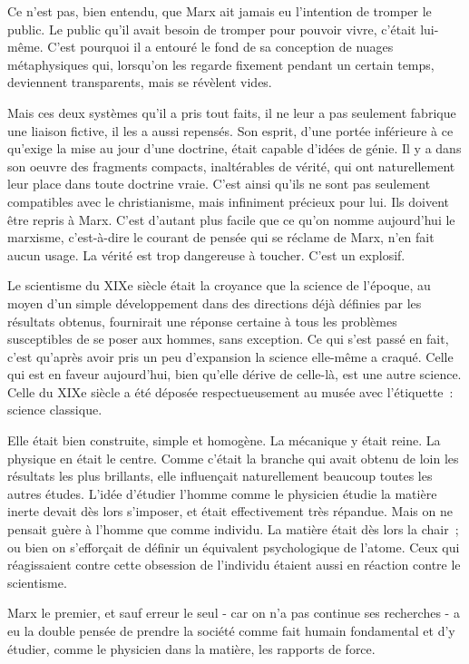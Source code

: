 \documentclass[french,twoside]{book} %
\begin{document}
Ce n'est pas, bien entendu, que Marx ait jamais eu l'intention de tromper le public. Le public qu'il avait besoin de tromper pour pouvoir vivre, c'était lui-même. C'est pourquoi il a entouré le fond de sa conception de nuages métaphysiques qui, lorsqu'on les regarde fixement pendant un certain temps, deviennent transparents, mais se révèlent vides.\par
Mais ces deux systèmes qu'il a pris tout faits, il ne leur a pas seulement fabrique une liaison fictive, il les a aussi repensés. Son esprit, d'une portée inférieure à ce qu'exige la mise au jour d'une doctrine, était capable d'idées de génie. Il y a dans son oeuvre des fragments compacts, inaltérables de vérité, qui ont naturellement leur place dans toute doctrine vraie. C'est ainsi qu'ils ne sont pas seulement compatibles avec le christianisme, mais infiniment précieux pour lui. Ils doivent être repris à Marx. C'est d'autant plus facile que ce qu'on nomme aujourd'hui le marxisme, c'est-à-dire le courant de pensée qui se réclame de Marx, n'en fait aucun usage. La vérité est trop dangereuse à toucher. C'est un explosif.\par
Le scientisme du XIXe siècle était la croyance que la science de l'époque, au moyen d'un simple développement dans des directions déjà définies par les résultats obtenus, fournirait une réponse certaine à tous les problèmes susceptibles de se poser aux hommes, sans exception. Ce qui s'est passé en fait, c'est qu'après avoir pris un peu d'expansion la science elle-même a craqué. Celle qui est en faveur aujourd'hui, bien qu'elle dérive de celle-là, est une autre science. Celle du XIXe siècle a été déposée respectueusement au musée avec l'étiquette : science classique.\par
Elle était bien construite, simple et homogène. La mécanique y était reine. La physique en était le centre. Comme c'était la branche qui avait obtenu de loin les résultats les plus brillants, elle influençait naturellement beaucoup toutes les autres études. L'idée d'étudier l'homme comme le physicien étudie la matière inerte devait dès lors s'imposer, et était effectivement très répandue. Mais on ne pensait guère à l'homme que comme individu. La matière était dès lors la chair ; ou bien on s'efforçait de définir un équivalent psychologique de l'atome. Ceux qui réagissaient contre cette obsession de l'individu étaient aussi en réaction contre le scientisme.\par
Marx le premier, et sauf erreur le seul - car on n'a pas continue ses recherches - a eu la double pensée de prendre la société comme fait humain fondamental et d'y étudier, comme le physicien dans la matière, les rapports de force.\par
\end{document}
